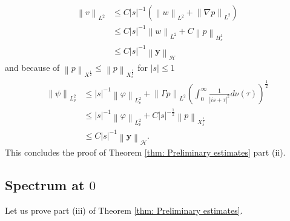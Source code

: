 \documentclass{amsart}
\newcommand{\abs}[1]{\left|#1\right|}
\newcommand{\norm}[1]{\left\| #1 \right\|}
\newcommand{\ynice}{\mathbf{y}}
\newcommand{\Ho}{\mathcal{H}}
\begin{document}
\begin{align*}
 \norm{v}_{L^2} &\leq C\abs{s}^{-1}(\norm{w}_{L^2} + \norm{\nabla p}_{L^2}) \\
 &\leq C\abs{s}^{-1}\norm{w}_{L^2} + C\norm{p}_{H^1_s} \\
 &\leq C\abs{s}^{-1}\norm{\ynice}_{\Ho}
\end{align*}
and because of $\norm{p}_{X^{\frac{1}{2}}}\leq\norm{p}_{X^{\frac{1}{2}}_s}$ for $\abs{s}\leq 1$
\begin{align*}
 \norm{\psi}_{L_{\nu}^2} &\leq \abs{s}^{-1}\norm{\varphi}_{L_{\nu}^2} 
   + \norm{\Gamma p}_{L^2}\left(\int_0^{\infty}\frac{1}{\abs{is+\tau}^2} d\nu(\tau)\right)^{\frac{1}{2}} \\
 &\leq \abs{s}^{-1}\norm{\varphi}_{L_{\nu}^2} + C\abs{s}^{-\frac{1}{2}}\norm{p}_{X^{\frac{1}{2}}_s} \\
 &\leq C\abs{s}^{-1}\norm{\ynice}_{\Ho}.
\end{align*}
This concludes the proof of Theorem \ref{thm: Preliminary estimates} part (ii).

\subsection{Spectrum at $0$}
Let us prove part (iii) of Theorem \ref{thm: Preliminary estimates}. 
\end{document}
